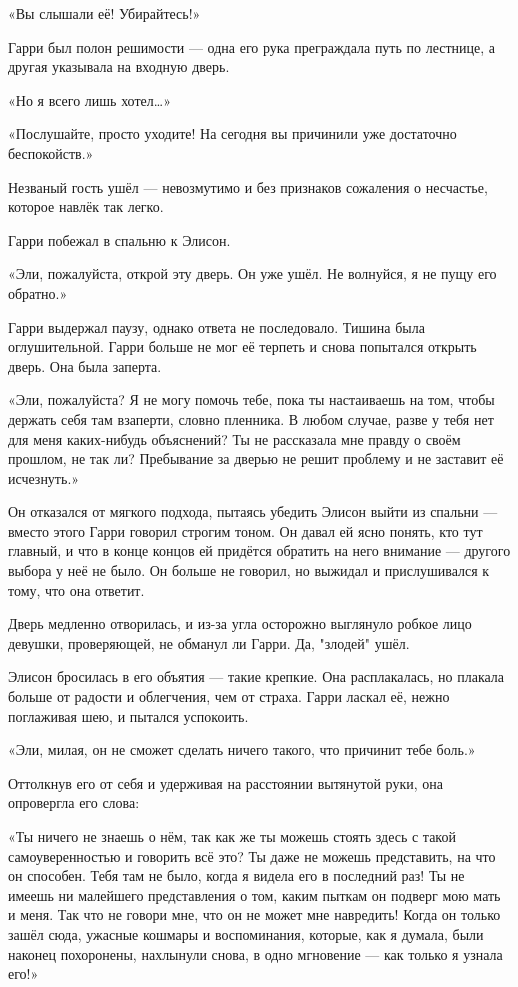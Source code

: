 \documentclass[a4paper,12pt]{book}
\begin{document}
«Вы слышали её! Убирайтесь!»
\par
Гарри был полон решимости — одна его рука преграждала путь по лестнице, а другая указывала на входную дверь.
\par
«Но я всего лишь хотел…»
\par
«Послушайте, просто уходите! На сегодня вы причинили уже достаточно беспокойств.»
\par
Незваный гость ушёл — невозмутимо и без признаков сожаления о несчастье, которое навлёк так легко.
\par
Гарри побежал в спальню к Элисон.
\par
«Эли, пожалуйста, открой эту дверь. Он уже ушёл. Не волнуйся, я не пущу его обратно.»
\par
Гарри выдержал паузу, однако ответа не последовало. Тишина была оглушительной. Гарри больше не мог её терпеть и снова попытался открыть дверь. Она была заперта.
\par
«Эли, пожалуйста? Я не могу помочь тебе, пока ты настаиваешь на том, чтобы держать себя там взаперти, словно пленника. В любом случае, разве у тебя нет для меня каких-нибудь объяснений? Ты не рассказала мне правду о своём прошлом, не так ли? Пребывание за дверью не решит проблему и не заставит её исчезнуть.»
\par
Он отказался от мягкого подхода, пытаясь убедить Элисон выйти из спальни — вместо этого Гарри говорил строгим тоном. Он давал ей ясно понять, кто тут главный, и что в конце концов ей придётся обратить на него внимание — другого выбора у неё не было. Он больше не говорил, но выжидал и прислушивался к тому, что она ответит.
\par
Дверь медленно отворилась, и из-за угла осторожно выглянуло робкое лицо девушки, проверяющей, не обманул ли Гарри. Да, "злодей" ушёл.
\par
Элисон бросилась в его объятия — такие крепкие. Она расплакалась, но плакала больше от радости и облегчения, чем от страха. Гарри ласкал её, нежно поглаживая шею, и пытался успокоить.
\par
«Эли, милая, он не сможет сделать ничего такого, что причинит тебе боль.»
\par
Оттолкнув его от себя и удерживая на расстоянии вытянутой руки, она опровергла его слова:
\par
«Ты ничего не знаешь о нём, так как же ты можешь стоять здесь с такой самоуверенностью и говорить всё это? Ты даже не можешь представить, на что он способен. Тебя там не было, когда я видела его в последний раз! Ты не имеешь ни малейшего представления о том, каким пыткам он подверг мою мать и меня. Так что не говори мне, что он не может мне навредить! Когда он только зашёл сюда, ужасные кошмары и воспоминания, которые, как я думала, были наконец похоронены, нахлынули снова, в одно мгновение — как только я узнала его!»
\end{document}
